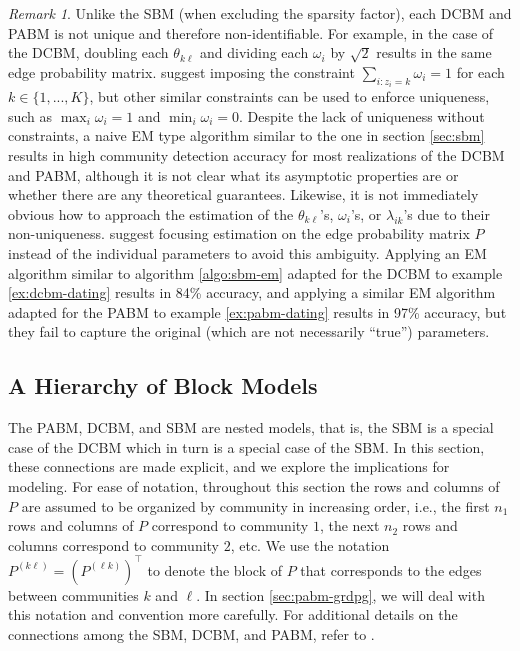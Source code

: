 \documentclass[
  11pt,
]{article}
\theoremstyle{definition}
\theoremstyle{definition}
\theoremstyle{definition}
\theoremstyle{definition}
\theoremstyle{remark}
\newtheorem*{remark}{Remark}
\begin{document}
\begin{remark}
Unlike the SBM (when excluding the sparsity factor), each DCBM and PABM is not unique and therefore non-identifiable. 
For example, in the case of the DCBM, doubling each $\theta_{k \ell}$ and dividing each $\omega_i$ by $\sqrt{2}$ results in the same edge probability matrix. 
\citet{Karrer_2011} suggest imposing the constraint $\sum_{i : z_i = k} \omega_i = 1$ for each $k \in \{1, ..., K\}$, but other similar constraints can be used to enforce uniqueness, such as $\max_i \omega_i = 1$ and $\min_i \omega_i = 0$. 
Despite the lack of uniqueness without constraints, a naive EM type algorithm similar to the one in section \ref{sec:sbm} results in high community detection accuracy for most realizations of the DCBM and PABM, although it is not clear what its asymptotic properties are or whether there are any theoretical guarantees. 
Likewise, it is not immediately obvious how to approach the estimation of the $\theta_{k \ell}$'s, $\omega_i$'s, or $\lambda_{ik}$'s due to their non-uniqueness. 
\citet{noroozi2019estimation} suggest focusing estimation on the edge probability matrix $P$ instead of the individual parameters to avoid this ambiguity. 
Applying an EM algorithm similar to algorithm \ref{algo:sbm-em} adapted for the DCBM to example \ref{ex:dcbm-dating} results in 84\% accuracy, and applying a similar EM algorithm adapted for the PABM to example \ref{ex:pabm-dating} results in 97\% accuracy, but they fail to capture the original (which are not necessarily ``true'') parameters. 
\end{remark}

\hypertarget{sec:hierarchy}{%
\subsection{A Hierarchy of Block Models}\label{sec:hierarchy}}

The PABM, DCBM, and SBM are nested models, that is, the SBM is a special case of the DCBM which in turn is a special case of the SBM.
In this section, these connections are made explicit, and we explore the implications for modeling.
For ease of notation, throughout this section the rows and columns of \(P\) are assumed to be organized by community in increasing order, i.e., the first \(n_1\) rows and columns of \(P\) correspond to community \(1\), the next \(n_2\) rows and columns correspond to community \(2\), etc.
We use the notation \(P^{(k \ell)} = (P^{(\ell k)})^\top\) to denote the block of \(P\) that corresponds to the edges between communities \(k\) and \(\ell\).
In section \ref{sec:pabm-grdpg}, we will deal with this notation and convention more carefully.
For additional details on the connections among the SBM, DCBM, and PABM, refer to \citet{Noroozi2022}.
\end{document}
